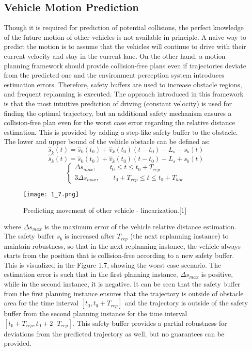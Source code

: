 \documentclass{report}
\begin{document}
\subsection{Vehicle Motion Prediction}
Though it is required for prediction of potential collisions, the perfect knowledge of the future motion of other vehicles is not available in principle. A naive way to predict the motion is to assume that the vehicles will continue to drive with their current velocity and stay in the current lane. On the other hand, a motion planning framework should provide collision-free plans even if trajectories deviate from the predicted one and the environment perception system introduces estimation errors. Therefore, safety buffers are used to increase obstacle regions, and frequent replanning is executed. The approach introduced in this framework is that the most intuitive prediction of driving (constant velocity) is used for finding the optimal trajectory, but an additional safety mechanism ensures a collision-free plan even for the worst case error regarding the relative distance estimation. This is provided by adding a step-like safety buffer to the obstacle. The lower and upper bound of the vehicle obstacle can be defined as:
\begin{equation}
\hat{\underline{s}}_k(t) = \hat{s}_k(t_0) + \hat{v}_k(t_0)(t-t_0) - L_s -s_b(t)
\end{equation}
\begin{equation}
\hat{\overline{s}}_k(t) = \hat{s}_k(t_0) + \hat{v}_k(t_0)(t-t_0) + L_s + s_b(t)
\end{equation}
\begin{equation}
\begin{cases}
\Delta s_{max}, \qquad t_0 \leq t \leq t_0 + T_{rep}\\
3  \Delta s_{max}, \qquad t_0 + T_{rep} \leq t \leq t_0 + T_{hor}
\end{cases}
\end{equation}
\begin{figure}[ht]
	\centering
	\texttt{[image: 1\_7.png]}
	\caption{Predicting movement of other vehicle - linearization.[1]}
	\label{fig:1.7} 
\end{figure}
where $\Delta s_{max}$ is the maximum error of the vehicle relative distance estimation. The safety buffer $s_b$ is increased after $T_{rep}$ (the next replanning instance) to maintain robustness,
so that in the next replanning instance, the vehicle always starts from the position that is collision-free according to a
new safety buffer. This is visualized in the Figure 1.7, showing the worst case scenario. The estimation error is such that
in the first planning instance, $\Delta s_{max}$ is positive, while in the second instance, it is negative. It can be seen that the safety buffer from the first planning instance ensures that the trajectory is outside of obstacle area for the time interval $[t_0 , t_0 + T_{rep} ]$ and the trajectory is outside of the safety buffer from the second planning instance for the time interval
$[t_0 + T_{rep} , t_0 + 2·T_{rep} ]$. This safety buffer provides a partial
robustness for deviations from the predicted trajectory as well, but no guarantees can be provided.
\end{document}
